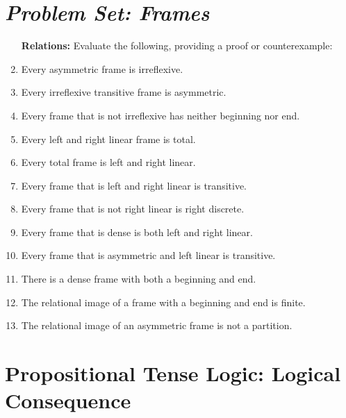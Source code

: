 \documentclass[a4paper, 11pt]{article} %
\begin{document}


\section*{\it Problem Set: Frames}

\begin{enumerate}[leftmargin=1.2in,itemsep=1pt]\small
	\item[\bf Relations:] Evaluate the following, providing a proof or counterexample:
    \item Every asymmetric frame is irreflexive.
    \item Every irreflexive transitive frame is asymmetric.
    \item Every frame that is not irreflexive has neither beginning nor end.
    \item Every left and right linear frame is total.
    \item Every total frame is left and right linear.
    \item Every frame that is left and right linear is transitive.
    \item Every frame that is not right linear is right discrete.
    \item Every frame that is dense is both left and right linear.
    \item Every frame that is asymmetric and left linear is transitive.
    \item There is a dense frame with both a beginning and end.
    \item The relational image of a frame with a beginning and end is finite.
    \item The relational image of an asymmetric frame is not a partition.
\end{enumerate}




\section*{\sc Propositional Tense Logic: Logical Consequence}
\end{document}
